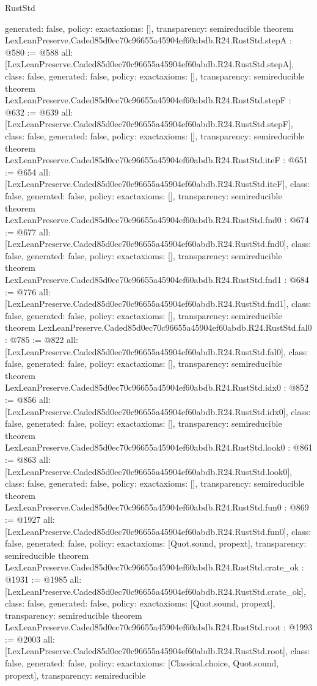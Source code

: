 \begin{lexlean}{RustStd}
\begin{coremodule}
{  generated: false,
  policy: exact{axioms: []},
  transparency: semireducible
}
theorem LexLeanPreserve.Caded85d0ec70c96655a45904ef60abdb.R24.RustStd.stepA : @580 := @588 {
  all: [LexLeanPreserve.Caded85d0ec70c96655a45904ef60abdb.R24.RustStd.stepA],
  class: false,
  generated: false,
  policy: exact{axioms: []},
  transparency: semireducible
}
theorem LexLeanPreserve.Caded85d0ec70c96655a45904ef60abdb.R24.RustStd.stepF : @632 := @639 {
  all: [LexLeanPreserve.Caded85d0ec70c96655a45904ef60abdb.R24.RustStd.stepF],
  class: false,
  generated: false,
  policy: exact{axioms: []},
  transparency: semireducible
}
theorem LexLeanPreserve.Caded85d0ec70c96655a45904ef60abdb.R24.RustStd.iteF : @651 := @654 {
  all: [LexLeanPreserve.Caded85d0ec70c96655a45904ef60abdb.R24.RustStd.iteF],
  class: false,
  generated: false,
  policy: exact{axioms: []},
  transparency: semireducible
}
theorem LexLeanPreserve.Caded85d0ec70c96655a45904ef60abdb.R24.RustStd.fnd0 : @674 := @677 {
  all: [LexLeanPreserve.Caded85d0ec70c96655a45904ef60abdb.R24.RustStd.fnd0],
  class: false,
  generated: false,
  policy: exact{axioms: []},
  transparency: semireducible
}
theorem LexLeanPreserve.Caded85d0ec70c96655a45904ef60abdb.R24.RustStd.fnd1 : @684 := @776 {
  all: [LexLeanPreserve.Caded85d0ec70c96655a45904ef60abdb.R24.RustStd.fnd1],
  class: false,
  generated: false,
  policy: exact{axioms: []},
  transparency: semireducible
}
theorem LexLeanPreserve.Caded85d0ec70c96655a45904ef60abdb.R24.RustStd.fal0 : @785 := @822 {
  all: [LexLeanPreserve.Caded85d0ec70c96655a45904ef60abdb.R24.RustStd.fal0],
  class: false,
  generated: false,
  policy: exact{axioms: []},
  transparency: semireducible
}
theorem LexLeanPreserve.Caded85d0ec70c96655a45904ef60abdb.R24.RustStd.idx0 : @852 := @856 {
  all: [LexLeanPreserve.Caded85d0ec70c96655a45904ef60abdb.R24.RustStd.idx0],
  class: false,
  generated: false,
  policy: exact{axioms: []},
  transparency: semireducible
}
theorem LexLeanPreserve.Caded85d0ec70c96655a45904ef60abdb.R24.RustStd.look0 : @861 := @863 {
  all: [LexLeanPreserve.Caded85d0ec70c96655a45904ef60abdb.R24.RustStd.look0],
  class: false,
  generated: false,
  policy: exact{axioms: []},
  transparency: semireducible
}
theorem LexLeanPreserve.Caded85d0ec70c96655a45904ef60abdb.R24.RustStd.fun0 : @869 := @1927 {
  all: [LexLeanPreserve.Caded85d0ec70c96655a45904ef60abdb.R24.RustStd.fun0],
  class: false,
  generated: false,
  policy: exact{axioms: [Quot.sound, propext]},
  transparency: semireducible
}
theorem LexLeanPreserve.Caded85d0ec70c96655a45904ef60abdb.R24.RustStd.crate_ok : @1931 := @1985 {
  all: [LexLeanPreserve.Caded85d0ec70c96655a45904ef60abdb.R24.RustStd.crate_ok],
  class: false,
  generated: false,
  policy: exact{axioms: [Quot.sound, propext]},
  transparency: semireducible
}
theorem LexLeanPreserve.Caded85d0ec70c96655a45904ef60abdb.R24.RustStd.root : @1993 := @2003 {
  all: [LexLeanPreserve.Caded85d0ec70c96655a45904ef60abdb.R24.RustStd.root],
  class: false,
  generated: false,
  policy: exact{axioms: [Classical.choice, Quot.sound, propext]},
  transparency: semireducible
}


\end{coremodule}
\end{lexlean}
